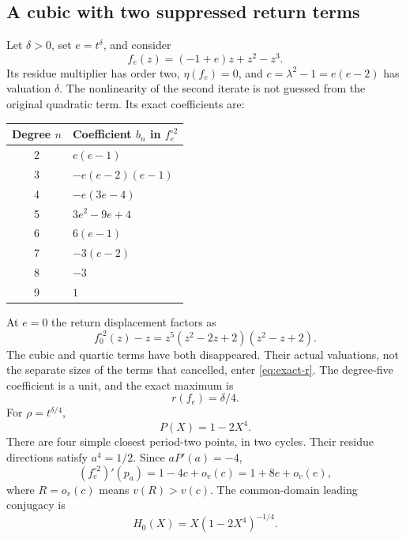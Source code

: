 \documentclass[11pt,letterpaper]{article}
\numberwithin{equation}{section}
\theoremstyle{plain}
\theoremstyle{definition}
\theoremstyle{remark}
\newcommand{\smallo}{o_v}
\begin{document}
\subsection{A cubic with two suppressed return terms}\label{subsec:tuned}

Let $\delta>0$, set $e=t^\delta$, and consider
\begin{equation}\label{eq:tuned-cubic}
 f_e(z)=(-1+e)z+z^2-z^3.
\end{equation}
Its residue multiplier has order two, $\eta(f_e)=0$, and
$c=\lambda^2-1=e(e-2)$ has valuation $\delta$. The nonlinearity of the
second iterate is not guessed from the original quadratic term. Its exact
coefficients are:
\begin{center}
\begin{tabular}{c l}
\toprule
Degree $n$ & Coefficient $b_n$ in $f_e^{\circ2}$\\
\midrule
2 & $e(e-1)$\\
3 & $-e(e-2)(e-1)$\\
4 & $-e(3e-4)$\\
5 & $3e^2-9e+4$\\
6 & $6(e-1)$\\
7 & $-3(e-2)$\\
8 & $-3$\\
9 & $1$\\
\bottomrule
\end{tabular}
\end{center}
At $e=0$ the return displacement factors as
\begin{equation}\label{eq:tuned-factor}
 f_0^{\circ2}(z)-z
   =z^5(z^2-2z+2)(z^2-z+2).
\end{equation}
The cubic and quartic terms have both disappeared. Their actual valuations,
not the separate sizes of the terms that cancelled, enter \eqref{eq:exact-r}.
The degree-five coefficient is a unit, and the exact maximum is
\begin{equation}\label{eq:tuned-r}
 \boxed{r(f_e)=\delta/4.}
\end{equation}
For $\rho=t^{\delta/4}$,
\[
 P(X)=1-2X^4.
\]
There are four simple closest period-two points, in two cycles. Their
residue directions satisfy $a^4=1/2$. Since $aP'(a)=-4$,
\begin{equation}\label{eq:tuned-mult}
 (f_e^{\circ2})'(p_a)=1-4c+\smallo(c)
                     =1+8e+\smallo(e),
\end{equation}
where $R=\smallo(c)$ means $v(R)>v(c)$.
The common-domain leading conjugacy is
\[
 H_0(X)=X(1-2X^4)^{-1/4}.
\]
\end{document}
